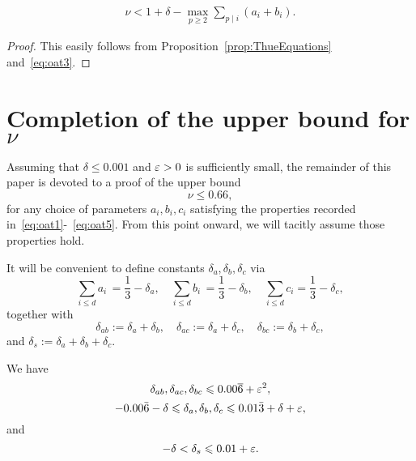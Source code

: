 \begin{proposition}\label{prop:ThueBound}
  \begin{align*}
  \nu < 1 +\delta- \max_{p\ge2}\sum_{p\mid i}(a_i+b_i).
  \end{align*}
\end{proposition}
\begin{proof}
  This easily follows from Proposition~\ref{prop:ThueEquations} and~\eqref{eq:oat3}.
\end{proof}

\section{Completion of the upper bound for \texorpdfstring{$\nu$}{nu}}

Assuming that
 $\delta\leq 0.001$ and
$\varepsilon>0$ is sufficiently small,
the remainder of this paper is devoted to a proof of the upper bound
\[\nu \le 0.66,
\]
for any choice of parameters $a_i,b_i ,c_i$ satisfying the properties recorded in~\eqref{eq:oat1}-~\eqref{eq:oat5}.
From this point onward, we will tacitly assume those properties hold.

\begin{definition}\label{def:delta}
  \leanok
  It will be convenient to define constants $\delta_a,\delta_b,\delta_c$ via
  \begin{equation}\label{eq:ai1/3}
  \sum_{i\leq d} a_i \, = \frac{1}{3}-\delta_a, \quad \sum_{i\leq d} b_i \, = \frac{1}{3}-\delta_b, \quad \sum_{i\leq d} c_i = \frac{1}{3}-\delta_c,
  \end{equation}
  together with
  \begin{equation*}
    \delta_{ab}:=\delta_a+\delta_b,\quad \delta_{ac}:=\delta_a+\delta_c, \quad \delta_{bc}:=\delta_b+\delta_c,
  \end{equation*}
  and $\delta_s := \delta_a+\delta_b+\delta_c$.
\end{definition}

\begin{lemma}\label{lem:deltaBounds}
  \leanok
  We have
  \begin{equation}\label{eq:robin2}
  \delta_{ab}, \delta_{ac}, \delta_{bc} \leqslant 0.00\overline{6} + \varepsilon^2,
  \end{equation}
  \begin{equation}\label{eq:robin1}
  -0.00\bar 6 - \delta \leqslant \delta_a,\delta_b,\delta_c \leqslant 0.01\bar3+\delta+\varepsilon,
  \end{equation}
  and
  \begin{equation}\label{eq:robin3}
    -\delta < \delta_s \leqslant 0.01+\varepsilon.
  \end{equation}
\end{lemma}

